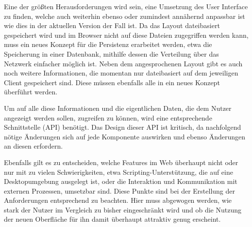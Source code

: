 Eine der größten Herausforderungen wird sein, eine Umsetzung des User Interface zu finden, welche auch weiterhin ebenso oder zumindest annähernd anpassbar ist wie dies in der aktuellen Version der Fall ist. Da das Layout dateibasiert gespeichert wird und im Browser nicht auf diese Dateien zugegriffen werden kann, muss ein neues Konzept für die Persistenz erarbeitet werden, etwa die Speicherung in einer Datenbank, mithilfe dessen die Verteilung über das Netzwerk einfacher möglich ist. 
Neben dem angesprochenen Layout gibt es auch noch weitere Informationen, die momentan nur dateibasiert auf dem jeweiligen Client gespeichert sind. Diese müssen ebenfalls alle in ein neues Konzept überführt werden.

Um auf alle diese Informationen und die eigentlichen Daten, die dem Nutzer angezeigt werden sollen, zugreifen zu können, wird eine entsprechende Schnittstelle (API) benötigt. Das Design dieser API ist kritisch, da nachfolgend nötige Änderungen sich auf jede Komponente auswirken und ebenso Änderungen an diesen erfordern. 

Ebenfalls gilt es zu entscheiden, welche Features im Web überhaupt nicht oder nur mit zu vielen Schwierigkeiten, etwa Scripting-Unterstützung, die auf eine Desktopumgebung ausgelegt ist, oder die Interaktion und Kommunikation mit externen Prozessen, umsetzbar sind. Diese Punkte sind bei der Erstellung der Anforderungen entsprechend zu beachten. Hier muss abgewogen werden, wie stark der Nutzer im Vergleich zu bisher eingeschränkt wird und ob die Nutzung der neuen Oberfläche für ihn damit überhaupt attraktiv genug erscheint.
